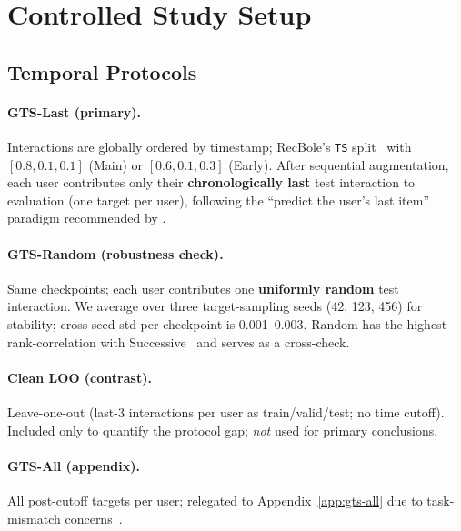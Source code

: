 \documentclass[sigconf,natbib=true,anonymous]{acmart}
\begin{document}
\section{Controlled Study Setup}
\label{sec:setup}

\subsection{Temporal Protocols}
\label{sec:protocol}

\paragraph{GTS-Last (primary).}
Interactions are globally ordered by timestamp; RecBole's \texttt{TS} split~\cite{zhao2021recbole} with $[0.8,0.1,0.1]$ (Main) or $[0.6,0.1,0.3]$ (Early).
After sequential augmentation, each user contributes only their \textbf{chronologically last} test interaction to evaluation (one target per user), following the ``predict the user's last item'' paradigm recommended by \citet{liang2024timetosplit}.

\paragraph{GTS-Random (robustness check).}
Same checkpoints; each user contributes one \textbf{uniformly random} test interaction.  We average over three target-sampling seeds (42, 123, 456) for stability; cross-seed std per checkpoint is 0.001--0.003.
Random has the highest rank-correlation with Successive~\cite{liang2024timetosplit} and serves as a cross-check.

\paragraph{Clean LOO (contrast).}
Leave-one-out (last-3 interactions per user as train/valid/test; no time cutoff).
Included only to quantify the protocol gap; \emph{not} used for primary conclusions.

\paragraph{GTS-All (appendix).}
All post-cutoff targets per user; relegated to Appendix~\ref{app:gts-all} due to task-mismatch concerns~\cite{liang2024timetosplit}.
\end{document}
